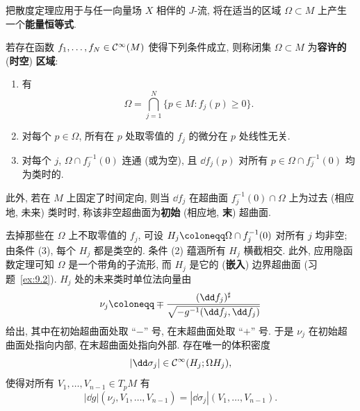 把散度定理应用于与任一向量场 $X$ 相伴的 $J$-流, 将在适当的区域 $\Omega \subset M$ 上产生一个\textbf{能量恒等式}.

\begin{definition}[容许时空区域]\label{def:9.14}
若存在函数 $f_1, \ldots, f_N \in \mathcal{C}^\infty(M)$ 使得下列条件成立, 则称闭集 $\Omega \subset M$ 为\textbf{容许的} (\textbf{时空}) \textbf{区域}:
\begin{enumerate}
    \item 有
    \begin{equation}\label{eq:9.26}
        \Omega = \bigcap_{j=1}^{N} \{p \in M : f_j(p) \ge 0\}.
    \end{equation}
    \item 对每个 $p \in \Omega$, 所有在 $p$ 处取零值的 $f_j$ 的微分在 $p$ 处线性无关.
    \item 对每个 $j$, $\Omega \cap f_j^{-1}(0)$ 连通 (或为空), 且 $\dd f_j(p)$ 对所有 $p \in \Omega \cap f_j^{-1}(0)$ 均为类时的.
\end{enumerate}
此外, 若在 $M$ 上固定了时间定向, 则当 $\dd f_j$ 在超曲面 $f_j^{-1}(0) \cap \Omega$ 上为过去 (相应地, 未来) 类时时, 称该非空超曲面为\textbf{初始} (相应地, \textbf{末}) 超曲面.
\end{definition}

去掉那些在 $\Omega$ 上不取零值的 $f_j$, 可设 $H_j \defeq \Omega \cap f_j^{-1}(0)$ 对所有 $j$ 均非空; 由条件 (3), 每个 $H_j$ 都是类空的. 条件 (2) 蕴涵所有 $H_j$ 横截相交. 此外, 应用隐函数定理可知 $\Omega$ 是一个带角的子流形, 而 $H_j$ 是它的 (\textbf{嵌入}) 边界超曲面 (习题~\ref{ex:9.2}). $H_j$ 处的未来类时单位法向量由
\begin{equation}\label{eq:9.27}
    \nu_j \defeq \mp \frac{(\dd f_j)^\sharp}{\sqrt{-g^{-1}(\dd f_j, \dd f_j)}}
\end{equation}
给出, 其中在初始超曲面处取 ``$-$'' 号, 在末超曲面处取 ``$+$'' 号. 于是 $\nu_j$ 在初始超曲面处指向内部, 在末超曲面处指向外部. 存在唯一的体积密度
\begin{equation}\label{eq:9.28}
    |\dd \sigma_j| \in \Smooth(H_j; \Omega H_j),
\end{equation}
使得对所有 $V_1, \ldots, V_{n-1} \in T_p M$ 有
\begin{equation}\label{eq:9.29}
    |\dd g|(\nu_j, V_1, \ldots, V_{n-1}) = |\dd \sigma_j|(V_1, \ldots, V_{n-1}).
\end{equation}

